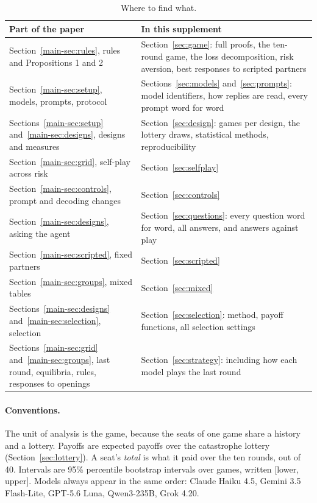 \documentclass[10pt]{article}
\begin{document}
\begin{table}[h]
\caption{Where to find what.}
\label{tab:guide}
\centering\small
\begin{tabular}{@{}>{\raggedright\arraybackslash}p{}>{\raggedright\arraybackslash}p{}@{}}
\toprule
Part of the paper & In this supplement \\
\midrule
Section~\ref{main-sec:rules}, rules and Propositions 1 and 2 & Section~\ref{sec:game}: full proofs, the ten-round game, the loss decomposition, risk aversion, best responses to scripted partners \\
Section~\ref{main-sec:setup}, models, prompts, protocol & Sections~\ref{sec:models} and~\ref{sec:prompts}: model identifiers, how replies are read, every prompt word for word \\
Sections~\ref{main-sec:setup} and~\ref{main-sec:designs}, designs and measures & Section~\ref{sec:design}: games per design, the lottery draws, statistical methods, reproducibility \\
Section~\ref{main-sec:grid}, self-play across risk & Section~\ref{sec:selfplay} \\
Section~\ref{main-sec:controls}, prompt and decoding changes & Section~\ref{sec:controls} \\
Section~\ref{main-sec:designs}, asking the agent & Section~\ref{sec:questions}: every question word for word, all answers, and answers against play \\
Section~\ref{main-sec:scripted}, fixed partners & Section~\ref{sec:scripted} \\
Section~\ref{main-sec:groups}, mixed tables & Section~\ref{sec:mixed} \\
Sections~\ref{main-sec:designs} and~\ref{main-sec:selection}, selection & Section~\ref{sec:selection}: method, payoff functions, all selection settings \\
Sections~\ref{main-sec:grid} and~\ref{main-sec:groups}, last round, equilibria, rules, responses to openings & Section~\ref{sec:strategy}: including how each model plays the last round \\
\bottomrule
\end{tabular}
\end{table}

\paragraph{Conventions.} The unit of analysis is the game, because the seats of one game share a history and a lottery. Payoffs are expected payoffs over the catastrophe lottery (Section~\ref{sec:lottery}). A seat's \emph{total} is what it paid over the ten rounds, out of 40. Intervals are 95\% percentile bootstrap intervals over games, written [lower, upper]. Models always appear in the same order: Claude Haiku 4.5, Gemini 3.5 Flash-Lite, GPT-5.6 Luna, Qwen3-235B, Grok 4.20.
\end{document}
